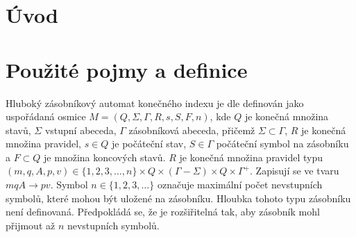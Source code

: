 

\chapter{Úvod}








\chapter{Použité pojmy a definice}

\begin{Def} Hluboký zásobníkový automat konečného indexu je dle \cite{Meduna:DeepPDA} definován jako uspořádaná osmice $M = (Q,\Sigma,\Gamma, R, s, S, F, n)$, kde 
$Q$ je konečná množina stavů, 
$\Sigma$ vstupní abeceda, 
$\Gamma$ zásobníková abeceda, přičemž $\Sigma \subset \Gamma$,
$R$ je konečná množina pravidel, 
$s \in Q$ je počáteční stav, 
$S \in \Gamma$ počáteční symbol na zásobníku a 
$F \subset Q$ je množina koncových stavů. 
$R$ je konečná množina pravidel typu $(m, q, A, p, v) \in \{1,2,3,\dots,n\} \times Q \times (\Gamma-\Sigma) \times Q \times {\Gamma}^+$. Zapisují se ve tvaru $mqA \rightarrow pv$. Symbol $n \in \{1,2,3,\dots\}$ označuje maximální počet nevstupních symbolů, které mohou být uložené na zásobníku.
Hloubka tohoto typu zásobníku není definovaná. Předpokládá se, že je rozšiřitelná tak, aby zásobník mohl přijmout až $n$ nevstupních symbolů.
\end{Def}


